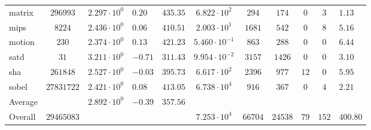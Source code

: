 \begin{tabular}{|l|c|HHc|c|c|c|c|cH|}
matrix        & $ 296993   $ & $ 2.297 \cdot 10^{0} $ & $ 0.20  $ & $ 435.35 $ & $ 6.822 \cdot 10^{2}  $ & $ 294   $ & $ 174   $ & $ 0   $ & $ 3   $ & $ 1.13    $ \\
mips          & $ 8224     $ & $ 2.436 \cdot 10^{0} $ & $ 0.06  $ & $ 410.51 $ & $ 2.003 \cdot 10^{1}  $ & $ 1681  $ & $ 542   $ & $ 0   $ & $ 8   $ & $ 5.16    $ \\
motion        & $ 230      $ & $ 2.374 \cdot 10^{0} $ & $ 0.13  $ & $ 421.23 $ & $ 5.460 \cdot 10^{-1} $ & $ 863   $ & $ 288   $ & $ 0   $ & $ 0   $ & $ 6.44    $ \\
satd          & $ 31       $ & $ 3.211 \cdot 10^{0} $ & $ -0.71 $ & $ 311.43 $ & $ 9.954 \cdot 10^{-2} $ & $ 3157  $ & $ 1426  $ & $ 0   $ & $ 0   $ & $ 3.10    $ \\
sha           & $ 261848   $ & $ 2.527 \cdot 10^{0} $ & $ -0.03 $ & $ 395.73 $ & $ 6.617 \cdot 10^{2}  $ & $ 2396  $ & $ 977   $ & $ 12  $ & $ 0   $ & $ 5.95    $ \\
sobel         & $ 27831722 $ & $ 2.421 \cdot 10^{0} $ & $ 0.08  $ & $ 413.05 $ & $ 6.738 \cdot 10^{4}  $ & $ 916   $ & $ 367   $ & $ 0   $ & $ 4   $ & $ 2.21    $ \\
\hline
Average       & $          $ & $ 2.892 \cdot 10^{0} $ & $ -0.39 $ & $ 357.56 $ & $                     $ & $       $ & $       $ & $     $ & $     $ & $         $ \\
\hline
Overall       & $ 29465083 $ & $                    $ & $       $ & $        $ & $ 7.253 \cdot 10^{4}  $ & $ 66704 $ & $ 24538 $ & $ 79  $ & $ 152 $ & $ 400.80  $ \\
\hline
\end{tabular}
